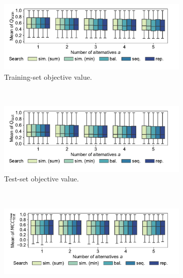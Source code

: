 \documentclass{article}
\theoremstyle{definition}
\begin{document}
\begin{figure}[p]
	\centering
	\begin{subfigure}[t]{\textwidth}
		\centering
		\includegraphics[width=\textwidth, trim=15 25 35 15, clip]{plots/afs-impact-search-mean-train-objective.pdf}
		\caption{Training-set objective value.}
		\label{fig:afs:impact-search-mean-train-objective}
	\end{subfigure}
	\\ \vspace{\baselineskip}
	\begin{subfigure}[t]{\textwidth}
		\centering
		\includegraphics[width=\textwidth, trim=15 25 35 15, clip]{plots/afs-impact-search-mean-test-objective.pdf}
		\caption{Test-set objective value.}
		\label{fig:afs:impact-search-mean-test-objective}
	\end{subfigure}
	\\ \vspace{\baselineskip}
	\begin{subfigure}[t]{\textwidth}
		\centering
		\includegraphics[width=\textwidth, trim=15 25 35 14, clip]{plots/afs-impact-search-mean-decision-tree-test-mcc.pdf}

\end{subfigure}
\end{figure}
\end{document}
